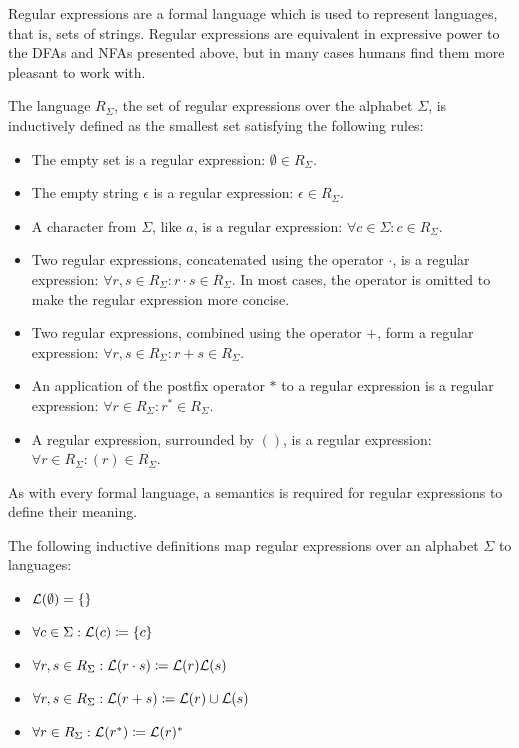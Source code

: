 Regular expressions are a formal language which is used to represent languages, that is, sets of strings.
Regular expressions are equivalent in expressive power to the DFAs and NFAs presented above,
but in many cases humans find them more pleasant to work with.

\begin{definition}
    The language $R_\Sigma$, the set of regular expressions over the alphabet $\Sigma$,
    is inductively defined as the smallest set satisfying the following rules:

    \begin{itemize}
        \item The empty set is a regular expression:
        $\emptyset \in R_\Sigma$.
        \item The empty string $\epsilon$ is a regular expression:
        $\epsilon \in R_\Sigma$.
        \item A character from $\Sigma$, like $a$, is a regular expression:
        $\forall c \in \Sigma: c \in R_\Sigma$.
        \item Two regular expressions, concatenated using the operator $\cdot$, is a regular expression:
        $\forall r, s \in R_\Sigma: r \cdot s \in R_\Sigma$.
        In most cases, the operator is omitted to make the regular expression more concise.
        \item Two regular expressions, combined using the operator $+$, form a regular expression:
        $\forall r, s \in R_\Sigma: r + s \in R_\Sigma$.
        \item An application of the postfix operator $\ast$ to a regular expression is a regular expression:
        $\forall r \in R_\Sigma: r^\ast \in R_\Sigma$.
        \item A regular expression, surrounded by $()$, is a regular expression:
        $\forall r \in R_\Sigma: (r) \in R_\Sigma$.
    \end{itemize}
\end{definition}

As with every formal language, a semantics is required for regular expressions to define their meaning.

\begin{definition}
    The following inductive definitions map regular expressions over an alphabet $\Sigma$ to languages:

    \begin{itemize}
        \item $\mathcal{L}(\emptyset) = \{\}$
        \item $\forall c \in \Sigma: \mathcal{L}(c) \coloneqq \{c\} $
        \item $\forall r, s \in R_\Sigma: \mathcal{L}(r \cdot s) \coloneqq \mathcal{L}(r) \mathcal{L}(s)$
        \item $\forall r, s \in R_\Sigma: \mathcal{L}(r + s) \coloneqq \mathcal{L}(r) \cup \mathcal{L}(s)$
        \item $\forall r \in R_\Sigma: \mathcal{L}(r^\ast) \coloneqq \mathcal{L}(r)^\ast$
    \end{itemize}
\end{definition}
